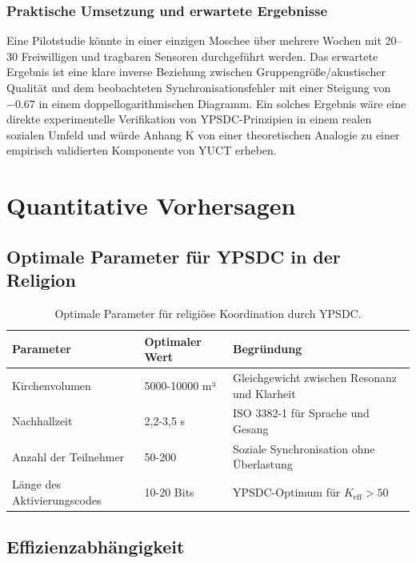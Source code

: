 \documentclass[12pt,a4paper]{article}
\begin{document}
	\subsubsection{Praktische Umsetzung und erwartete Ergebnisse}
	Eine Pilotstudie könnte in einer einzigen Moschee über mehrere Wochen mit 20–30 Freiwilligen und tragbaren Sensoren durchgeführt werden. Das erwartete Ergebnis ist eine klare inverse Beziehung zwischen Gruppengröße/akustischer Qualität und dem beobachteten Synchronisationsfehler mit einer Steigung von \(-0.67\) in einem doppellogarithmischen Diagramm. Ein solches Ergebnis wäre eine direkte experimentelle Verifikation von YPSDC-Prinzipien in einem realen sozialen Umfeld und würde Anhang K von einer theoretischen Analogie zu einer empirisch validierten Komponente von YUCT erheben.
	
	\section{Quantitative Vorhersagen}
	
	\subsection{Optimale Parameter für YPSDC in der Religion}
	
	\begin{table}[h]
		\centering
		\begin{tabular}{p{}p{}p{}}
			\toprule
			\textbf{Parameter} & \textbf{Optimaler Wert} & \textbf{Begründung} \\
			\midrule
			Kirchenvolumen & 5000-10000 m³ & Gleichgewicht zwischen Resonanz und Klarheit \\
			Nachhallzeit & 2,2-3,5 s & ISO 3382-1 für Sprache und Gesang \\
			Anzahl der Teilnehmer & 50-200 & Soziale Synchronisation ohne Überlastung \\
			Länge des Aktivierungscodes & 10-20 Bits & YPSDC-Optimum für $K_{\mathrm{eff}} > 50$ \\
			\bottomrule
		\end{tabular}
		\caption{Optimale Parameter für religiöse Koordination durch YPSDC.}
		\label{tab:optimal-params}
	\end{table}
	
	\subsection{Effizienzabhängigkeit}
	
\end{document}
